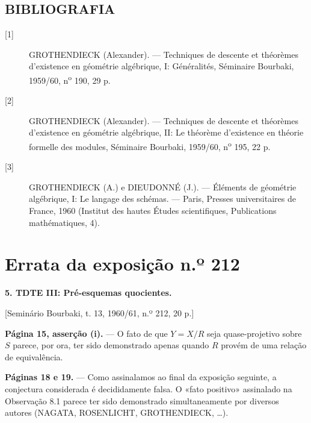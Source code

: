 \documentclass[11pt,twoside,openany]{book}
\numberwithin{equation}{section}
\newcommand{\src}[1]{%
  \phantomsection\hypertarget{src:#1}{}%
  \marginpar{\raggedleft\footnotesize\sffamily #1}%
}
\newcommand{\sid}[1]{\phantomsection\hypertarget{fga:#1}{}}
\theoremstyle{plain}
\theoremstyle{definition}
\theoremstyle{remark}
\newcommand{\FgaUnitKey}{frontmatter}
\renewcommand{\src}[1]{%
  \phantomsection\hypertarget{src:\FgaUnitKey:#1}{}%
  \marginpar{\raggedleft\footnotesize\sffamily #1}%
}
\begin{document}
\section*{BIBLIOGRAFIA}

\begin{description}
\item[{[1]}] GROTHENDIECK (Alexander). --- Techniques de descente et théorèmes
d'existence en géométrie algébrique, I: Généralités, Séminaire Bourbaki,
1959/60, n\textsuperscript{o} 190, 29 p.

\item[{[2]}] GROTHENDIECK (Alexander). --- Techniques de descente et théorèmes
d'existence en géométrie algébrique, II: Le théorème d'existence en théorie
formelle des modules, Séminaire Bourbaki, 1959/60,
n\textsuperscript{o} 195, 22 p.

\item[{[3]}] GROTHENDIECK (A.) e DIEUDONNÉ (J.). --- Éléments de géométrie
algébrique, I: Le langage des schémas. --- Paris, Presses universitaires de
France, 1960 (Institut des hautes Études scientifiques, Publications
mathématiques, 4).
\end{description}

\par

\def\FgaUnitKey{e212}\clearpage
\chapter*{Errata da exposição n.º 212}
\setcounter{footnote}{2}
\sid{e212}
\src{301}

\noindent\textbf{5. TDTE III: Pré-esquemas quocientes.}

\begin{center}
[Seminário Bourbaki, t. 13, 1960/61, n.º 212, 20 p.]
\end{center}

\noindent\textbf{Página 15, asserção (i).} --- O fato de que $Y=X/R$ seja
quase-projetivo sobre $S$ parece, por ora, ter sido demonstrado apenas quando
$R$ provém de uma relação de equivalência.

\noindent\textbf{Páginas 18 e 19.} --- Como assinalamos ao final da exposição
seguinte, a conjectura considerada é decididamente falsa. O «fato positivo»
assinalado na Observação 8.1 parece ter sido demonstrado simultaneamente por
diversos autores (NAGATA, ROSENLICHT, GROTHENDIECK, \ldots).
\end{document}
